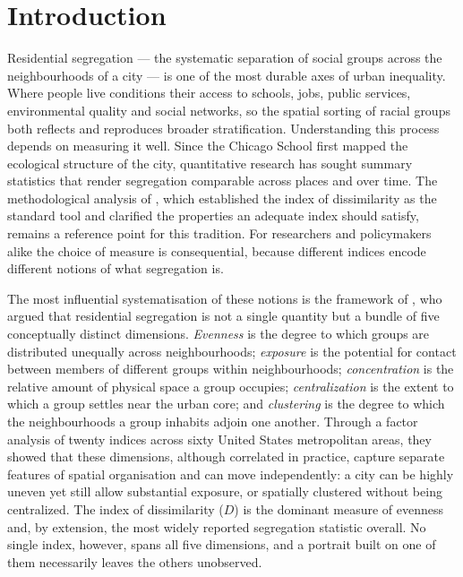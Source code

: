 \documentclass[pdflatex,sn-basic]{sn-jnl}%
\begin{document}
\section{Introduction}\label{sec:intro}

Residential segregation --- the systematic separation of social groups across the neighbourhoods of a city --- is one of the most durable axes of urban inequality. Where people live conditions their access to schools, jobs, public services, environmental quality and social networks, so the spatial sorting of racial groups both reflects and reproduces broader stratification. Understanding this process depends on measuring it well. Since the Chicago School first mapped the ecological structure of the city, quantitative research has sought summary statistics that render segregation comparable across places and over time. The methodological analysis of \citet{duncan1955methodological}, which established the index of dissimilarity as the standard tool and clarified the properties an adequate index should satisfy, remains a reference point for this tradition. For researchers and policymakers alike the choice of measure is consequential, because different indices encode different notions of what segregation is.

The most influential systematisation of these notions is the framework of \citet{massey1988dimensions}, who argued that residential segregation is not a single quantity but a bundle of five conceptually distinct dimensions. \emph{Evenness} is the degree to which groups are distributed unequally across neighbourhoods; \emph{exposure} is the potential for contact between members of different groups within neighbourhoods; \emph{concentration} is the relative amount of physical space a group occupies; \emph{centralization} is the extent to which a group settles near the urban core; and \emph{clustering} is the degree to which the neighbourhoods a group inhabits adjoin one another. Through a factor analysis of twenty indices across sixty United States metropolitan areas, they showed that these dimensions, although correlated in practice, capture separate features of spatial organisation and can move independently: a city can be highly uneven yet still allow substantial exposure, or spatially clustered without being centralized. The index of dissimilarity ($D$) is the dominant measure of evenness and, by extension, the most widely reported segregation statistic overall. No single index, however, spans all five dimensions, and a portrait built on one of them necessarily leaves the others unobserved.
\end{document}
